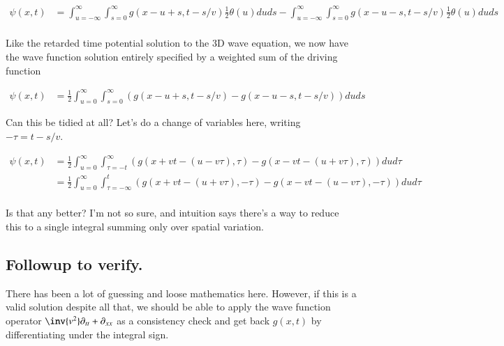 \documentclass{article}
\begin{document}
\begin{align*}
{\psi}(x, t)
&=
\int_{u=-\infty}^\infty
\int_{s= 0}^\infty
{g}(x-u+s, t-s/v)
\frac{1}{2} \theta(u ) 
du ds
-\int_{u=-\infty}^\infty
\int_{s= 0}^\infty
{g}(x-u -s, t-s/v)
\frac{1}{2} \theta(u) 
du ds \\
\end{align*}

Like the retarded time potential solution to the 3D wave equation, we now have the wave function solution entirely specified by a
weighted sum of the driving function

\begin{align}
{\psi}(x, t)
&=
\frac{1}{2}
\int_{u = 0}^\infty
\int_{s = 0}^\infty
\left( {g}(x-u+s, t-s/v) - {g}(x-u -s, t-s/v) \right)
du ds
\end{align}

Can this be tidied at all?  Let's do a change of variables here, writing $-\tau = t -s/v$.

%
%
% 
\begin{align*}
{\psi}(x, t)
&=
\frac{1}{2}
\int_{u = 0}^\infty
\int_{\tau = -t}^\infty
\left( {g}(x+vt -(u - v\tau), \tau) - {g}(x-v t -(u +v\tau), \tau) \right)
du d\tau \\
&=
\frac{1}{2}
\int_{u = 0}^\infty
\int_{\tau = -\infty}^{t}
\left( {g}(x+vt -(u + v\tau), -\tau) - {g}(x-v t -(u -v\tau), -\tau) \right)
du d\tau \\
\end{align*}

Is that any better?  I'm not so sure, and intuition says there's a way to reduce this to a single integral summing
only over spatial variation.

\subsection{ Followup to verify. }

There has been a lot of guessing and loose mathematics here.  However, if this is a valid solution despite all that, we should be
able to apply the wave function operator $\inv{v^2} \partial_{tt} + \partial_{xx}$ as a 
consistency check and get back $g(x,t)$ by differentiating
under the integral sign.
\end{document}
